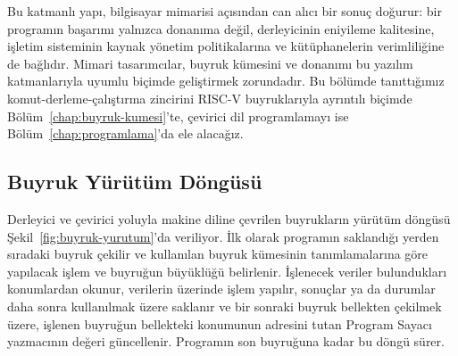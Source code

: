 Bu katmanlı yapı, bilgisayar mimarisi açısından can alıcı bir sonuç doğurur: bir programın başarımı yalnızca donanıma değil, derleyicinin eniyileme kalitesine, işletim sisteminin kaynak yönetim politikalarına ve kütüphanelerin verimliliğine de bağlıdır. Mimari tasarımcılar, buyruk kümesini ve donanımı bu yazılım katmanlarıyla uyumlu biçimde geliştirmek zorundadır. Bu bölümde tanıttığımız komut-derleme-çalıştırma zincirini RISC-V buyruklarıyla ayrıntılı biçimde Bölüm~\ref{chap:buyruk-kumesi}'te, çevirici dil programlamayı ise Bölüm~\ref{chap:programlama}'da ele alacağız.

\subsection{Buyruk Yürütüm Döngüsü}
\label{subsec:buyruk-yurutum-dongusu}

Derleyici ve çevirici yoluyla makine diline çevrilen buyrukların yürütüm döngüsü Şekil~\ref{fig:buyruk-yurutum}'da veriliyor. İlk olarak programın saklandığı yerden sıradaki buyruk çekilir ve kullanılan buyruk kümesinin tanımlamalarına göre yapılacak işlem ve buyruğun büyüklüğü belirlenir. İşlenecek veriler bulundukları konumlardan okunur, verilerin üzerinde işlem yapılır, sonuçlar ya da durumlar daha sonra kullanılmak üzere saklanır ve bir sonraki buyruk bellekten çekilmek üzere, işlenen buyruğun bellekteki konumunun adresini tutan Program Sayacı yazmacının değeri güncellenir. Programın son buyruğuna kadar bu döngü sürer.

